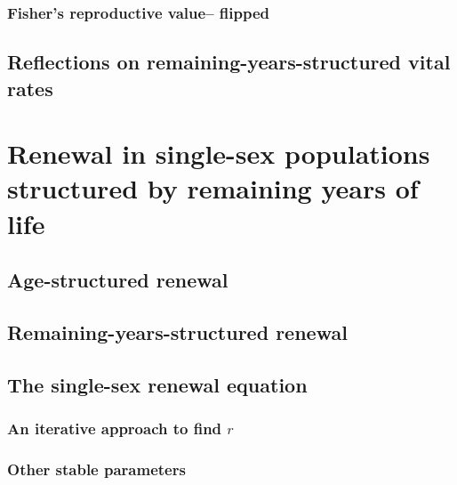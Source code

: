     \subsection{Fisher's reproductive value-- flipped}
      
  \section{Reflections on remaining-years-structured vital rates}
      
      
\chapter{Renewal in single-sex populations structured by remaining years of
life}
    
    \section{Age-structured renewal}
      
    
    \section{Remaining-years-structured renewal}
      
    
    \section{The single-sex renewal equation}
      
      
      \subsection{An iterative approach to find $r$}
        
        
      \subsection{Other stable parameters}
        
      
